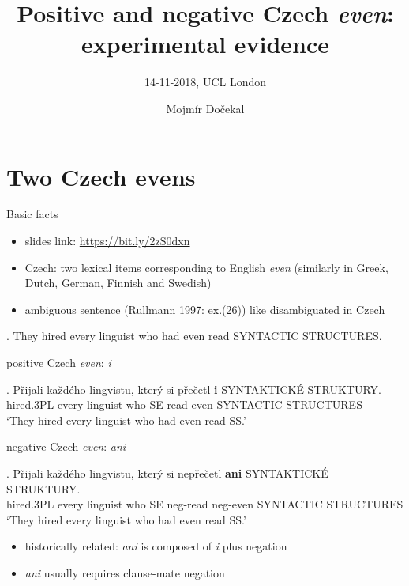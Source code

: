 \documentclass[ignorenonframetext,]{beamer}
\title{Positive and negative Czech \emph{even}: experimental evidence}
\subtitle{14-11-2018, UCL London}
\author{Mojmír Dočekal}
\date{}
\providecommand{\tightlist}{%
  \setlength{\itemsep}{0pt}\setlength{\parskip}{0pt}}
\begin{document}
\frame{\titlepage}

\section{Two Czech evens}\label{two-czech-evens}

\begin{frame}{Basic facts}

\begin{itemize}
\tightlist
\item
  slides link: \url{https://bit.ly/2zS0dxn}
\item
  Czech: two lexical items corresponding to English \emph{even}
  (similarly in Greek, Dutch, German, Finnish and Swedish)
\item
  ambiguous sentence (Rullmann 1997: ex.(26)) like \Next disambiguated
  in Czech
\end{itemize}

\ex. They hired every linguist who had even read SYNTACTIC STRUCTURES.

\end{frame}

\begin{frame}

positive Czech \emph{even}: \emph{i}

\exg. Přijali každého lingvistu, který si přečetl \textbf{i} SYNTAKTICKÉ
STRUKTURY.\\
hired.3PL every linguist who SE read even SYNTACTIC STRUCTURES\\
`They hired every linguist who had even read SS.'

negative Czech \emph{even}: \emph{ani}

\exg. Přijali každého lingvistu, který si nepřečetl \textbf{ani}
SYNTAKTICKÉ STRUKTURY.\\
hired.3PL every linguist who SE neg-read neg-even SYNTACTIC STRUCTURES\\
`They hired every linguist who had even read SS.'

\end{frame}

\begin{frame}

\begin{itemize}
\tightlist
\item
  historically related: \emph{ani} is composed of \emph{i} plus negation
\item
  \emph{ani} usually requires clause-mate negation
\end{itemize}

\end{frame}
\end{document}
